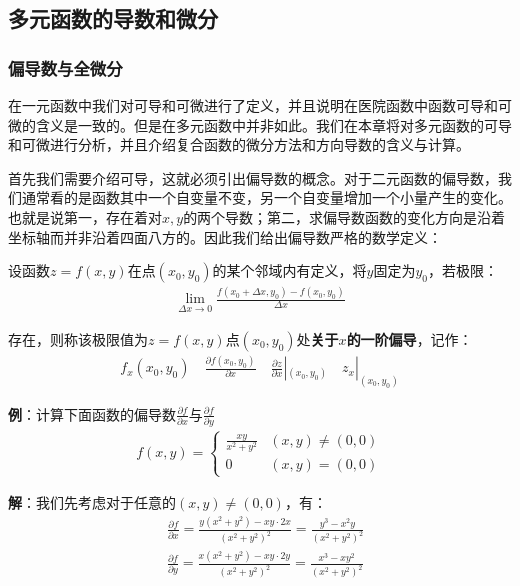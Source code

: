 \documentclass{ctexart}
\let\oldtextbf\textbf %
\renewcommand{\textbf}[1]{\textcolor{btex}{\oldtextbf{#1}}} %
\begin{document}
\subsection{多元函数的导数和微分}
\subsubsection{偏导数与全微分}
在一元函数中我们对可导和可微进行了定义，并且说明在医院函数中函数可导和可微的含义是一致的。但是在多元函数中并非如此。我们在本章将对多元函数的可导和可微进行分析，并且介绍复合函数的微分方法和方向导数的含义与计算。

首先我们需要介绍可导，这就必须引出偏导数的概念。对于二元函数的偏导数，我们通常看的是函数其中一个自变量不变，另一个自变量增加一个小量产生的变化。也就是说第一，存在着对$x,y$的两个导数；第二，求偏导数函数的变化方向是沿着坐标轴而并非沿着四面八方的。因此我们给出偏导数严格的数学定义：
\begin{tcolorbox}[
    colback=bac2,     %
    colframe=fra2,   %
    coltitle=white,             %
    coltext=tex2,
    title=偏导数的定义,
    fonttitle=\bfseries,        %
arc=3mm,                     %
breakable
]
设函数$z=f(x,y)$在点$(x_0,y_0)$的某个邻域内有定义，将$y$固定为$y_0$，若极限：
\begin{align*}
    \lim_{\Delta x\to 0}\frac{f(x_0+\Delta x,y_0)-f(x_0,y_0)}{\Delta x}\tag{7-4}
\end{align*}

存在，则称该极限值为$z=f(x,y)$点$(x_0,y_0)$处\textbf{关于$x$的一阶偏导}，记作：
\begin{align*}
    f_x(x_0,y_0)\quad \frac{\partial f(x_0,y_0)}{\partial x}\quad \frac{\partial z}{\partial x}|_{(x_0,y_0)}\quad z_x|_{(x_0,y_0)}
\end{align*}
\end{tcolorbox}

\textbf{例}：计算下面函数的偏导数$\frac{\partial f}{\partial x}$与$\frac{\partial f}{\partial y}$
\begin{align*}
    f(x,y)=\begin{cases}
        \frac{xy}{x^2+y^2} &(x,y)\neq (0,0)\\
        0 & (x,y)=(0,0)
    \end{cases}
\end{align*}

\textbf{解}：我们先考虑对于任意的$(x,y)\neq (0,0)$，有：
\begin{align*}
    &\frac{\partial f}{\partial x}=\frac{y(x^2+y^2)-xy\cdot 2x}{(x^2+y^2)^2}=\frac{y^3-x^2y}{(x^2+y^2)^2}\\
    &\frac{\partial f}{\partial y}=\frac{x(x^2+y^2)-xy\cdot 2y}{(x^2+y^2)^2}=\frac{x^3-xy^2}{(x^2+y^2)^2}
\end{align*}
\end{document}
